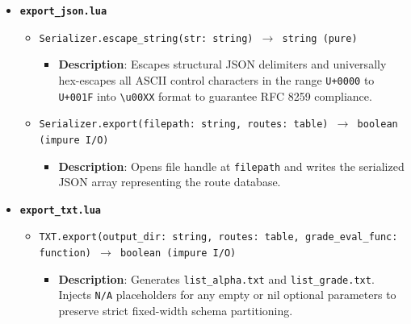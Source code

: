 \begin{itemize}
    \item \textbf{\texttt{export\_json.lua}}
    \begin{itemize}
        \item \texttt{Serializer.escape\_string(str: string) $\rightarrow$ string (pure)}
        \begin{itemize}
            \item \textbf{Description}: Escapes structural JSON delimiters and universally hex-escapes all ASCII control characters in the range \texttt{U+0000} to \texttt{U+001F} into \texttt{\textbackslash u00XX} format to guarantee RFC 8259 compliance.
        \end{itemize}
        \item \texttt{Serializer.export(filepath: string, routes: table) $\rightarrow$ boolean (impure I/O)}
        \begin{itemize}
            \item \textbf{Description}: Opens file handle at \texttt{filepath} and writes the serialized JSON array representing the route database.
        \end{itemize}
    \end{itemize}

    \item \textbf{\texttt{export\_txt.lua}}
    \begin{itemize}
        \item \texttt{TXT.export(output\_dir: string, routes: table, grade\_eval\_func: function) $\rightarrow$ boolean (impure I/O)}
        \begin{itemize}
            \item \textbf{Description}: Generates \texttt{list\_alpha.txt} and \texttt{list\_grade.txt}. Injects \texttt{N/A} placeholders for any empty or nil optional parameters to preserve strict fixed-width schema partitioning.
        \end{itemize}
    \end{itemize}
\end{itemize}
